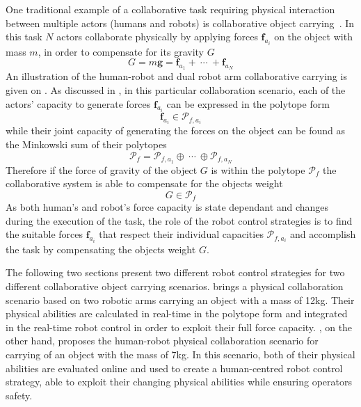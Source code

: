 One traditional example of a collaborative task requiring physical interaction between multiple actors (humans and robots) is collaborative object carrying~\cite{Arai2000carrying,Kosuge1997carrying,Tsumugiwa2002carrying}. In this task $N$ actors collaborate physically by applying forces $\bm{f}_{a_i}$ on the object with mass $m$, in order to compensate for its gravity $G$
\begin{equation}
    G=m\bm{g}=\bm{f}_{a_1} + ~\cdots ~+\bm{f}_{a_N}
\end{equation}
An illustration of the human-robot and dual robot arm collaborative carrying is given on . As discussed in , in this particular collaboration scenario, each of the actors' capacity to generate forces $\bm{f}_{a_i}$ can be expressed in the polytope form
\begin{equation}
    \bm{f}_{a_i} \in \mathcal{P}_{f,a_i}
\end{equation}
while their joint capacity of generating the forces on the object can be found as the Minkowski sum of their polytopes
\begin{equation}
    \mathcal{P}_f = \mathcal{P}_{f,a_1} \oplus~\cdots~\oplus \mathcal{P}_{f,a_N}
\end{equation}
Therefore if the force of gravity of the object $G$ is within the polytope $\mathcal{P}_f$ the collaborative system is able to compensate for the objects weight
\begin{equation}
    G \in \mathcal{P}_f
\end{equation}
As both human's and robot's force capacity is state dependant and changes during the execution of the task, the role of the robot control strategies is to find the suitable forces $\bm{f}_{a_i}$ that respect their individual capacities $\mathcal{P}_{f,a_i}$ and accomplish the task by compensating the objects weight $G$. 

The following two sections present two different robot control strategies for two different collaborative object carrying scenarios.  brings a physical collaboration scenario based on two robotic arms carrying an object with a mass of 12kg. Their physical abilities are calculated in real-time in the polytope form and integrated in the real-time robot control in order to exploit their full force capacity. , on the other hand, proposes the human-robot physical collaboration scenario for carrying of an object with the mass of 7kg. In this scenario, both of their physical abilities are evaluated online and used to create a human-centred robot control strategy, able to exploit their changing physical abilities while ensuring operators safety. 


